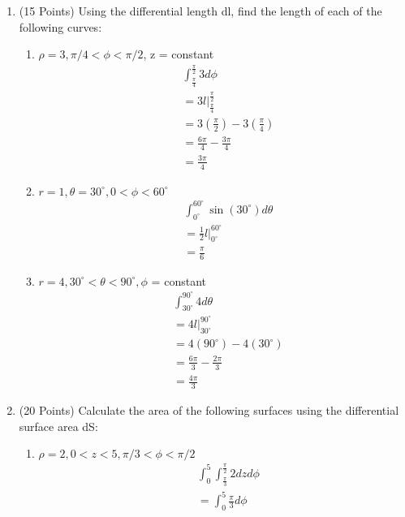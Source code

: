 \documentclass{article}
\begin{document}
\begin{enumerate}
    \item (15 Points) Using the differential length dl, find the length of each of the following curves:
    \begin{enumerate}
        \item $\rho = 3, \pi/4 < \phi < \pi/2$, z = constant
        \begin{align}
            &\int_{\frac{\pi}{4}}^{\frac{\pi}{2}}3d\phi\\
            &=3l\bigg|_{\frac{\pi}{4}}^{\frac{\pi}{2}}\\
            &=3(\frac{\pi}{2}) - 3(\frac{\pi}{4})\\
            &=\frac{6\pi}{4} - \frac{3\pi}{4}\\
            &=\boxed{\frac{3\pi}{4}}
            \end{align}
        \item $r = 1, \theta = 30^\circ, 0 < \phi < 60^\circ$
        \begin{align} 
            &\int_{0^\circ}^{60^\circ}\sin(30^\circ)d\theta\\
            &=\frac{1}{2}l\bigg|_{0^\circ}^{60^\circ}\\
            &=\boxed{\frac{\pi}{6}}
        \end{align}
        \item $r = 4, 30^\circ < \theta < 90^\circ, \phi$ = constant
        \begin{align}
            &\int_{30^\circ}^{90^\circ}4d\theta\\
            &=4l\bigg|_{30^\circ}^{90^\circ}\\
            &=4(90^\circ) - 4(30^\circ)\\
            &=\frac{6\pi}{3}  - \frac{2\pi}{3}\\
            &=\boxed{\frac{4\pi}{3}}
        \end{align}
    \end{enumerate}
    \newpage
    \item (20 Points) Calculate the area of the following surfaces using the differential surface area dS:
    \begin{enumerate}
        \item $\rho = 2, 0 < z <5, \pi/3 < \phi < \pi/2$
        \begin{align}
            &\int_0^5\int_{\frac{\pi}{3}}^{\frac{\pi}{2}}2dzd\phi\\
            &=\int_0^5\frac{\pi}{3}d\phi\\

\end{align}
\end{enumerate}
\end{enumerate}
\end{document}
